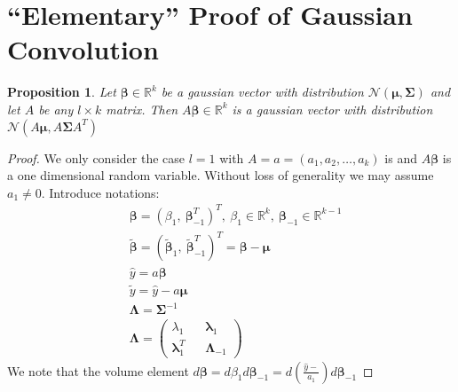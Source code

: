 \documentclass[10pt,fleqn]{amsart}
\newtheorem{proposition}[theorem]{Proposition}
\theoremstyle{definition}
\theoremstyle{remark}
\numberwithin{equation}{section}
\newcommand{\RR}{\mathbb{R}}
\newcommand{\bbeta}{\boldsymbol{\beta}}
\newcommand{\mmu}{\boldsymbol{\mu}}
\newcommand{\SSigma}{\boldsymbol{\Sigma}}
\newcommand{\llambda}{\boldsymbol{\lambda}}
\newcommand{\LLambda}{\boldsymbol{\Lambda}}
\newcommand{\yhat}{\widehat{y}}
\begin{document}
\appendix\section{``Elementary'' Proof of Gaussian Convolution}\label{appendix_gauss_conv}
\begin{proposition}
    Let $\bbeta\in\RR^k$ be a gaussian vector with distribution $\mathcal{N}(\mmu,\SSigma)$ and let $A$ be any $l\times k$ matrix.
    Then $A\bbeta\in\RR^k$ is a gaussian vector with distribution $\mathcal{N}(A\mmu,A\SSigma A^T)$
\end{proposition}
\begin{proof} We only consider the case $l=1$ with $A=a=(a_1, a_2,\ldots, a_k)$ is and $A\bbeta$ is a one dimensional random variable.
Without loss of generality we may assume $a_1\neq 0$. Introduce notations:
\begin{align}
    &\bbeta = \left(\beta_1,\ \bbeta_{-1}^T\right)^T,\ \beta_1\in\RR^k,\ \bbeta_{-1}\in\RR^{k-1}\\
    &\widetilde{\bbeta}=\left(\widetilde{\bbeta}_1,\ \widetilde{\bbeta}_{-1}^T\right)^T=\bbeta-\mmu\\
    &\yhat = a\bbeta\\
    &\widetilde{y}=\yhat-a\mmu\\
    &\LLambda=\SSigma^{-1}\\
    &\LLambda=\left(\begin{matrix}
        \lambda_1 && \llambda_1\\
        \llambda_1^T && \LLambda_{-1}
    \end{matrix}\right)
\end{align}
We note that the volume element $d\bbeta=d\beta_1d\bbeta_{-1}=d\left(\frac{\yhat-}{a_1}\right)d\bbeta_{-1}$
\end{proof}
\end{document}
